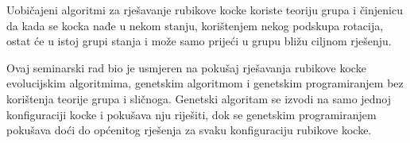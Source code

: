 \documentclass[times, utf8, seminar, numeric]{fer}
\begin{document}
Uobičajeni algoritmi za rješavanje rubikove kocke koriste teoriju grupa i činjenicu da kada se kocka nađe u nekom stanju, korištenjem nekog podskupa rotacija, ostat će u istoj grupi stanja i može samo prijeći u grupu bližu ciljnom rješenju.

Ovaj seminarski rad bio je usmjeren na pokušaj rješavanja rubikove kocke evolucijskim algoritmima, genetskim algoritmom i genetskim programiranjem bez korištenja teorije grupa i sličnoga. Genetski algoritam se izvodi na samo jednoj konfiguraciji kocke i pokušava nju riješiti, dok se genetskim programiranjem pokušava doći do općenitog rješenja za svaku konfiguraciju rubikove kocke.

 
\end{document}
